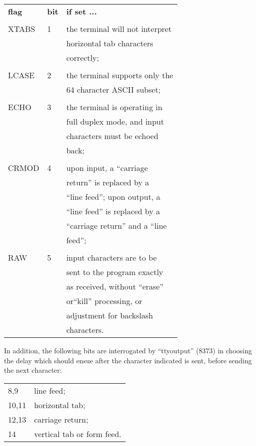 \noindent\begin{tabular}{lll}\\
{\bf flag} &  {\bf bit} & {\bf if set ...}\\
 \\
XTABS & 1 & the terminal will not interpret \\
& & horizontal tab characters\\
& &  correctly; \\
 \\
LCASE & 2 & the terminal supports only the \\
& & 64 character ASCII subset; \\
 \\
ECHO & 3 & the terminal is operating in \\
& & full duplex mode, and input \\
& & characters must be echoed \\
& & back; \\
 \\
CRMOD & 4 & upon input, a ``carriage \\
& & return'' is replaced by a \\
& & ``line feed''; upon output, a\\
& & ``line feed'' is replaced by a\\
& & ``carriage return'' and a ``line\\
& &  feed''; \\
 \\
RAW & 5 & input characters are to be \\
& & sent to the program exactly \\
& & as received, without ``erase''\\
& & or``kill'' processing, or\\
& & adjustment for backslash\\
& & characters. \\
\end{tabular}

In addition, the following bits are
interrogated by ``ttyoutput'' (8373) in
choosing the delay which should ensue
after the character indicated is sent,
before sending the next character:


\begin{tabular}{ll}\\
8,9 & line feed;\\
10,11 & horizontal tab;\\
12,13 & carriage return;\\
14 & vertical tab or form feed.\\
\end{tabular}
\ed

